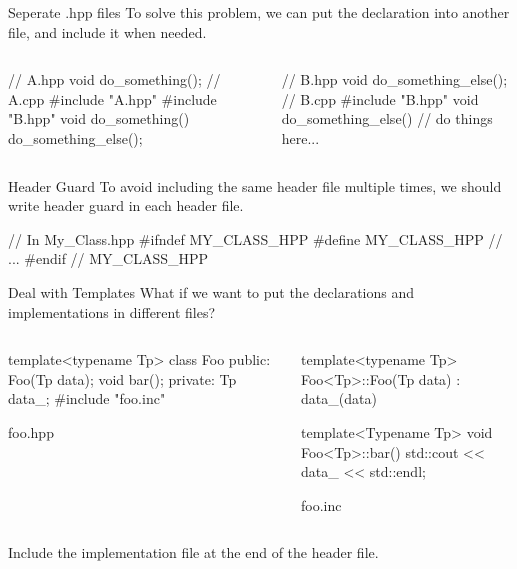 \begin{frame}[fragile]{Seperate .hpp files}
  To solve this problem, we can put the declaration into another file, and include it when needed.
  \begin{columns}
    \begin{column}{0.5\linewidth}
      \begin{cpp}
// A.hpp
void do_something();
// A.cpp
#include "A.hpp"
#include "B.hpp"
void do_something() {
  do_something_else();
}
      \end{cpp}
    \end{column}
    \begin{column}{0.5\linewidth}
      \begin{cpp}
// B.hpp
void do_something_else();
// B.cpp
#include "B.hpp"
void do_something_else() {
  // do things here...
}
      \end{cpp}
    \end{column}
    \end{columns}
\end{frame}
\begin{frame}[fragile]{Header Guard}
  To avoid including the same header file multiple times, we should write header guard in each header file.
  \begin{cpp}
// In My_Class.hpp
#ifndef MY_CLASS_HPP 
#define MY_CLASS_HPP
    // ...
#endif // MY_CLASS_HPP
  \end{cpp}
\end{frame}
\begin{frame}[fragile]{Deal with Templates}
  What if we want to put the declarations and implementations in different files?\pause 
  \begin{columns}
    \begin{column}{0.5\linewidth}
      \begin{cpp}
template<typename Tp>
class Foo{
 public:
  Foo(Tp data);
  void bar();
 private: 
  Tp data_;
}
#include "foo.inc"
      \end{cpp}
      foo.hpp
    \end{column}
    \begin{column}{0.5\linewidth}
      \begin{cpp}
template<typename Tp>
Foo<Tp>::Foo(Tp data) 
  : data_(data) {}

template<Typename Tp>
void Foo<Tp>::bar() {
  std::cout << data_ 
            << std::endl;
}
      \end{cpp}
      foo.inc
    \end{column}
  \end{columns}
Include the implementation file at the end of the header file.\\
\end{frame}
